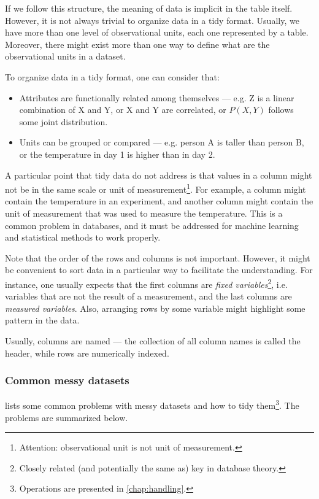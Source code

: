 If we follow this structure, the meaning of data is implicit in the table itself.
However, it is not always trivial to organize data in a tidy format.  Usually, we have
more than one level of observational units, each one represented by a table.  Moreover,
there might exist more than one way to define what are the observational units in a
dataset.

To organize data in a tidy format, one can consider that:
\begin{itemize}
  \item Attributes are functionally related among themselves --- e.g. Z is a linear
    combination of X and Y, or X and Y are correlated, or $P(X, Y)$ follows some joint distribution.
  \item Units can be grouped or compared --- e.g. person A is taller than person B, or
    the temperature in day 1 is higher than in day 2.
\end{itemize}

A particular point that tidy data do not address is that values in a column might not be
in the same scale or unit of measurement\footnote{Attention: observational unit is not
unit of measurement.}.  For example, a column might contain the
temperature in an experiment, and another column might contain the unit of measurement
that was used to measure the temperature.  This is a common problem in databases, and it
must be addressed for machine learning and statistical methods to work properly.

Note that the order of the rows and columns is not important.  However, it might be
convenient to sort data in a particular way to facilitate the understanding.  For
instance, one usually expects that the first columns are \emph{fixed
variables}\footnote{Closely related (and potentially the same as) key in database
theory.}, i.e. variables that are not the result of a measurement, and the last columns
are \emph{measured variables}.  Also, arranging rows by some variable might highlight some
pattern in the data.

Usually, columns are named --- the collection of all column names is called the
header, while rows are numerically indexed.

\subsubsection{Common messy datasets}

\textcite{Wickham2014} lists some common problems with messy datasets and how to tidy
them\footnote{Operations are presented in \cref{chap:handling}.}.  The problems are
summarized below.

